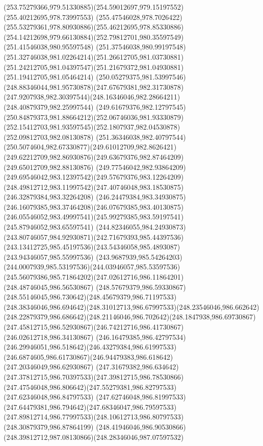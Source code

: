 {{\curveto(253.75279366,979.51330885)(254.59012697,979.15197552)(255.40212695,978.73997553)
\curveto(255.47546028,978.7026422)(255.53279361,978.80930886)(255.46212695,978.85330886)
\curveto(254.14212698,979.66130884)(252.79812701,980.35597549)(251.41546038,980.95597548)
\curveto(251.37546038,980.99197548)(251.32746038,981.02264214)(251.26612705,981.03730881)
\curveto(251.24212705,981.04397547)(251.21679372,981.04930881)(251.19412705,981.05464214)
\curveto(250.05279375,981.53997546)(248.88346044,981.95730878)(247.67679381,982.31730878)
\curveto(247.9207938,982.30397544)(248.16346046,982.28664211)(248.40879379,982.25997544)
\curveto(249.61679376,982.12797545)(250.84879373,981.88664212)(252.06746036,981.93330879)
\curveto(252.15412703,981.93597545)(252.1807937,982.04530878)(252.09812703,982.08130878)
\curveto(251.36346038,982.40797544)(250.5074604,982.67330877)(249.61012709,982.8626421)
\curveto(249.62212709,982.86930876)(249.63679376,982.87464209)(249.65012709,982.88130876)
\curveto(249.77546042,982.93864209)(249.69546042,983.12397542)(249.57679376,983.12264209)
\curveto(248.49812712,983.11997542)(247.40746048,983.18530875)(246.32879384,983.32264208)
\curveto(246.24479384,983.34930875)(246.16079385,983.37464208)(246.07679385,983.40130875)
\curveto(246.05546052,983.49997541)(245.99279385,983.59197541)(245.87946052,983.65597541)
\curveto(244.82346055,984.24930873)(243.80746057,984.92930871)(242.71679393,985.44397536)
\curveto(243.13412725,985.45197536)(243.54346058,985.4893087)(243.94346057,985.55997536)
\curveto(243.9687939,985.54264203)(244.0007939,985.53197536)(244.03946057,985.53597536)
\curveto(245.56079386,985.71864202)(247.02612716,986.11864201)(248.48746045,986.56530867)
\curveto(248.57679379,986.59330867)(248.55146045,986.730642)(248.45679379,986.71197533)
\curveto(248.38346046,986.694642)(248.31012713,986.67997533)(248.23546046,986.662642)
\curveto(248.22879379,986.686642)(248.21146046,986.702642)(248.1847938,986.69730867)
\curveto(247.45812715,986.52930867)(246.74212716,986.41730867)(246.02612718,986.34130867)
\curveto(246.16479385,986.42797534)(246.29946051,986.518642)(246.43279384,986.61997533)
\curveto(246.6874605,986.61730867)(246.94479383,986.618642)(247.20346049,986.62930867)
\curveto(247.31679382,986.634642)(247.37812715,986.70397533)(247.39812715,986.78530866)
\curveto(247.47546048,986.806642)(247.55279381,986.82797533)(247.62346048,986.84797533)
\curveto(247.62746048,986.81997533)(247.64479381,986.794642)(247.68346047,986.79597533)
\curveto(247.89812714,986.77997533)(248.10612713,986.80797533)(248.30879379,986.87864199)
\curveto(248.41946046,986.90530866)(248.39812712,987.08130866)(248.28346046,987.07597532)
}}
